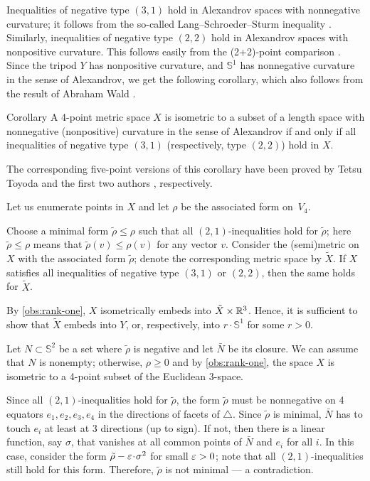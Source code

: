 \documentclass[a4paper,10pt]{article}
\begin{document}
Inequalities of negative type $(3, 1)$ hold in Alexandrov spaces with nonnegative curvature; it follows from the so-called Lang--Schroeder--Sturm inequality \cite{lang-schroeder, sturm}.
Similarly, inequalities of negative type $(2, 2)$ hold in Alexandrov spaces with nonpositive curvature.
This follows easily from the (2+2)-point comparison \cite[9.5]{AKP-2024}.
Since the tripod $Y$ has nonpositive curvature, and $\mathbb{S}^1$ has nonnegative curvature in the sense of Alexandrov, we get the following corollary, which also follows from the result of Abraham Wald \cite[§ 7]{wald}.

\begin{thm}{Corollary}\label{cor:Four-point arrays}
A 4-point metric space $X$ is isometric to a subset of a length space with nonnegative (nonpositive) curvature in the sense of Alexandrov if and only if all inequalities of negative type $(3, 1)$ (respectively, type $(2, 2)$) hold in $X$.
\end{thm}

The corresponding five-point versions of this corollary have been proved by Tetsu Toyoda \cite{toyoda,lebedeva-petrunin2021} and the first two authors \cite{lebedeva-petrunin-2024}, respectively.

Let us enumerate points in $X$ and let $\rho$ be the associated form on~$V_4$.

Choose a minimal form $\tilde\rho\le \rho$ such that all $(2,1)$-inequalities hold for $\tilde\rho$;
here $\tilde\rho\le \rho$ means that $\tilde\rho(v)\le \rho(v)$ for any vector $v$.
Consider the (semi)metric on $X$ with the associated form $\tilde\rho$;
denote the corresponding metric space by $\tilde X$.
If $X$ satisfies all inequalities of negative type $(3, 1)$ or $(2,2)$, then the same holds for $\tilde X$.

By \ref{obs:rank-one}, $X$ isometrically embeds into $\tilde X\times \mathbb{R}^3$.
Hence, it is sufficient to show that $\tilde X$ embeds into $Y$, or, respectively, into $r\cdot \mathbb{S}^1$ for some $r>0$.

Let $N\subset \mathbb{S}^2$ be a set where $\tilde\rho$ is negative and let $\bar N$ be its closure.
We can assume that $N$ is nonempty; otherwise,
$\rho\ge 0$ and by \ref{obs:rank-one}, the space $X$ is isometric to a 4-point subset of the Euclidean 3-space.

Since all $(2,1)$-inequalities hold for $\tilde\rho$, the form $\tilde\rho$
must be nonnegative on 4 equators $e_1,e_2,e_3,e_4$ in the directions of facets of $\triangle$.
Since $\tilde\rho$ is minimal, $\bar N$ has to touch $e_i$ at least at 3 directions (up to sign). 
If not, then there is a linear function, say $\sigma$, that vanishes at all common points of $\bar N$ and $e_i$ for all $i$.
In this case, consider the form $\tilde\rho-\eps\cdot \sigma^2$ for small $\varepsilon>0$;
note that all $(2,1)$-inequalities still hold for this form.
Therefore, $\tilde\rho$ is not minimal --- a contradiction.
\end{document}
